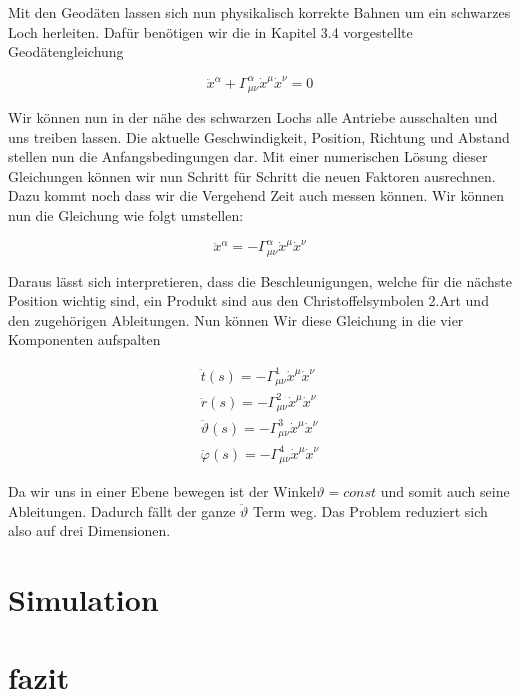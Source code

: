 \begin{refsection}
	Mit den Geodäten lassen sich nun physikalisch korrekte Bahnen um ein schwarzes Loch herleiten. Dafür benötigen wir die in Kapitel 3.4 vorgestellte Geodätengleichung
	
	\begin{equation}
	\ddot{x}^{\alpha} + \Gamma^{\alpha}_{\mu\nu}\dot{x}^{\mu}\dot{x}^{\nu} = 0
	\end{equation}
	
	Wir können nun in der nähe des schwarzen Lochs alle Antriebe ausschalten und uns treiben lassen. Die aktuelle Geschwindigkeit, Position, Richtung und Abstand stellen nun die Anfangsbedingungen dar. Mit einer numerischen Lösung dieser Gleichungen können wir nun Schritt für Schritt die neuen Faktoren ausrechnen. Dazu kommt noch dass wir die Vergehend Zeit auch messen können.
	Wir können nun die Gleichung wie folgt umstellen:
	
	\begin{equation}
	\ddot{x}^{\alpha} = -\Gamma^{\alpha}_{\mu\nu}\dot{x}^{\mu}\dot{x}^{\nu}
	\end{equation}
	
	Daraus lässt sich interpretieren, dass die Beschleunigungen, welche für die nächste Position wichtig sind, ein Produkt sind aus den Christoffelsymbolen 2.Art und den zugehörigen Ableitungen.
	Nun können Wir diese Gleichung in die vier Komponenten aufspalten
	
	\begin{align*}
		\ddot{t}(s) = -\Gamma^{1}_{\mu\nu}\dot{x}^{\mu}\dot{x}^{\nu}\\
		\ddot{r}(s) = -\Gamma^{2}_{\mu\nu}\dot{x}^{\mu}\dot{x}^{\nu}\\
		\ddot{\vartheta}(s) = -\Gamma^{3}_{\mu\nu}\dot{x}^{\mu}\dot{x}^{\nu}\\
		\ddot{\varphi}(s) = -\Gamma^{4}_{\mu\nu}\dot{x}^{\mu}\dot{x}^{\nu}		
	\end{align*}
	
	Da wir uns in einer Ebene bewegen ist der Winkel$\vartheta = const$ und somit auch seine Ableitungen. Dadurch fällt der   ganze $\ddot{\vartheta}$ Term weg. Das Problem reduziert sich also auf drei Dimensionen.	
	
	
	
	\section{Simulation}
	
	
	\section{fazit}
	
	
	


	\printbibliography[heading=subbibliography]
	\end{refsection}

